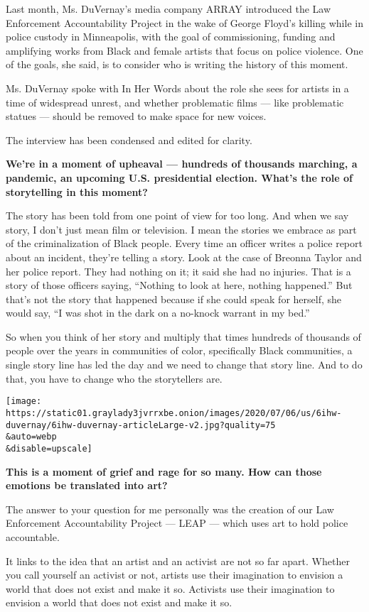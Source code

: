 Last month, Ms. DuVernay's media company ARRAY introduced the Law
Enforcement Accountability Project in the wake of George Floyd's killing
while in police custody in Minneapolis, with the goal of commissioning,
funding and amplifying works from Black and female artists that focus on
police violence. One of the goals, she said, is to consider who is
writing the history of this moment.

Ms. DuVernay spoke with In Her Words about the role she sees for artists
in a time of widespread unrest, and whether problematic films --- like
problematic statues --- should be removed to make space for new voices.

The interview has been condensed and edited for clarity.

\textbf{We're in a moment of upheaval --- hundreds of thousands
marching, a pandemic, an upcoming U.S. presidential election. What's the
role of storytelling in this moment?}

The story has been told from one point of view for too long. And when we
say story, I don't just mean film or television. I mean the stories we
embrace as part of the criminalization of Black people. Every time an
officer writes a police report about an incident, they're telling a
story. Look at the case of Breonna Taylor and her police report. They
had nothing on it; it said she had no injuries. That is a story of those
officers saying, ``Nothing to look at here, nothing happened.'' But
that's not the story that happened because if she could speak for
herself, she would say, ``I was shot in the dark on a no-knock warrant
in my bed.''

So when you think of her story and multiply that times hundreds of
thousands of people over the years in communities of color, specifically
Black communities, a single story line has led the day and we need to
change that story line. And to do that, you have to change who the
storytellers are.

\texttt{[image: https://static01.graylady3jvrrxbe.onion/images/2020/07/06/us/6ihw-duvernay/6ihw-duvernay-articleLarge-v2.jpg?quality=75\\\&auto=webp\\\&disable=upscale]}

\textbf{This is a moment of grief and rage for so many. How can those
emotions be translated into art?}

The answer to your question for me personally was the creation of our
Law Enforcement Accountability Project --- LEAP --- which uses art to
hold police accountable.

It links to the idea that an artist and an activist are not so far
apart. Whether you call yourself an activist or not, artists use their
imagination to envision a world that does not exist and make it so.
Activists use their imagination to envision a world that does not exist
and make it so.


